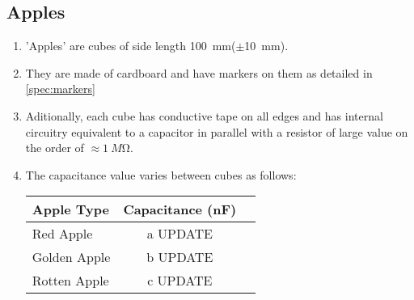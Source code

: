 \subsection{Apples}
\label{spec:apples}

\begin{enumerate}
  \item 'Apples' are cubes of side length \SI{100}{mm}($\pm$\SI{10}{mm}).
  \item They are made of cardboard and have markers on them as detailed in \ref{spec:markers}
  \item Aditionally, each cube has conductive tape on all edges and has internal
        circuitry equivalent to a capacitor in parallel with a resistor of large value
        on the order of $\approx\SI{1}{M\ohm}$.
  \item The capacitance value varies between cubes as follows:
  \begin{center}
      \begin{tabular}{lcc}
            \toprule
            \textbf{Apple Type}     &     \textbf{Capacitance (\si{nF})}    \\
            \midrule
            Red Apple               &     a UPDATE       \\
            Golden Apple            &     b UPDATE       \\
            Rotten Apple            &     c UPDATE       \\
            \bottomrule
            \end{tabular}
  \end{center}

\end{enumerate}

